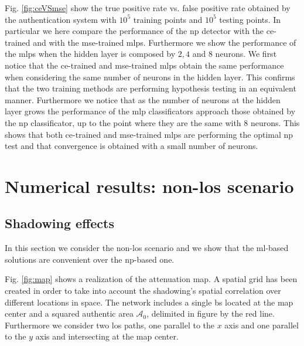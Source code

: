 \documentclass[draftcls,onecolumn,12pt]{IEEEtran}
\begin{document}
Fig. \ref{fig:ceVSmse} show the true positive rate vs. false positive rate obtained by the authentication system with $10^5$ training points and $10^5$ testing points. In particular we here compare the performance of the \ac{np} detector with the \ac{ce}-trained and with the \ac{mse}-trained \acp{mlp}. Furthermore we show the performance of the \acp{mlp} when the hidden layer is composed by $2,4 $ and $8$ neurons. We first notice that the \ac{ce}-trained and \ac{mse}-trained \acp{mlp} obtain the same performance when considering the same number of neurons in the hidden layer. This confirms that the two training methods are performing hypothesis testing in an equivalent manner. Furthermore we notice that as the number of neurons at the hidden layer grows the performance of the \ac{mlp} classificators approach those obtained by the \ac{np} classificator, up to the point where they are the same with $8$ neurons. This shows that both \ac{ce}-trained and \ac{mse}-trained \acp{mlp} are performing the optimal \ac{np} test and that convergence is obtained with a small number of neurons.



\section{Numerical results: non-los scenario}\label{sec:res_nLos}
\subsection{Shadowing effects}\label{sec:shadow}
In this section we consider the non-\ac{los} scenario and we show that the \ac{ml}-based solutions are convenient over the \ac{np}-based one.

Fig. \ref{fig:map} shows a realization of the attenuation map. A spatial grid has been created in order to take into account the shadowing's spatial correlation over different locations in space. The network includes a single \ac{bs} located at the map center and a squared authentic area $\mathcal{A}_0$, delimited in figure by the red line. Furthermore we consider two \ac{los} paths, one parallel to the $x$ axis and one parallel to the $y$ axis and intersecting at the map center.
\end{document}
